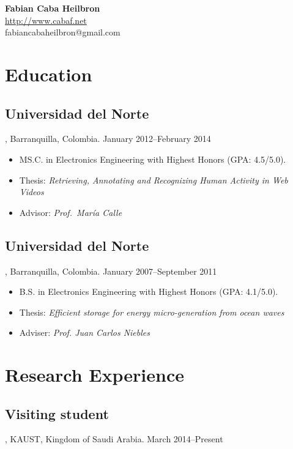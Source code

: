 \documentclass[letterpaper,10pt]{article}
\begin{document}
\begin{center}
  \Large 
  \textbf{Fabian Caba Heilbron} \\[1ex]
  \normalsize
  \url{http://www.cabaf.net} \\
  fabiancabaheilbron@gmail.com
\end{center}


\section{Education}

\subsection{Universidad del Norte}, Barranquilla, Colombia. \hfill January 2012--February 2014 

\begin{itemize}
  \item MS.C. in Electronics Engineering with Highest Honors (GPA: 4.5/5.0).
  \item Thesis:  \emph{Retrieving, Annotating and Recognizing Human Activity in Web Videos}
  \item Advisor:  \emph{Prof.~Mar\'ia Calle} \\
  
\end{itemize}

\subsection{Universidad del Norte}, Barranquilla, Colombia. \hfill January 2007--September 2011 

\begin{itemize}
  \item B.S. in Electronics Engineering with Highest Honors (GPA: 4.1/5.0).
  \item Thesis:  \emph{Efficient storage for energy micro-generation from ocean waves}
  \item Adviser:  \emph{Prof. Juan Carlos Niebles} \\
\end{itemize}

\section{Research Experience}

\subsection{Visiting student}, KAUST, Kingdom of Saudi Arabia. \hfill March 2014--Present
\end{document}
